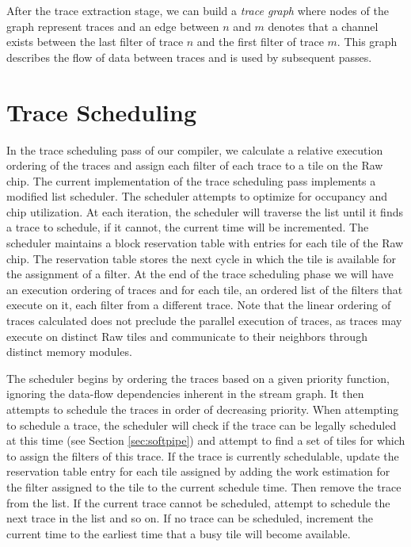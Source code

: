 After the trace extraction stage, we can build a {\it trace graph}
where nodes of the graph represent traces and an edge between $n$ and
$m$ denotes that a channel exists between the last filter of trace $n$
and the first filter of trace $m$. This graph describes the flow of data
between traces and is used by subsequent passes.

\section{Trace Scheduling}
\label{sec:scheduling}
In the trace scheduling pass of our compiler, we calculate a relative
execution ordering of the traces and assign each filter of each trace
to a tile on the Raw chip.  The current implementation of the trace
scheduling pass implements a modified list scheduler. The scheduler
attempts to optimize for occupancy and chip utilization.  At each
iteration, the scheduler will traverse the list until it finds a trace
to schedule, if it cannot, the current time will be incremented.  The
scheduler maintains a block reservation table with entries for each
tile of the Raw chip.  The reservation table stores the next cycle in
which the tile is available for the assignment of a filter.  At the
end of the trace scheduling phase we will have an execution ordering of
traces and for each tile, an ordered list of the filters that execute
on it, each filter from a different trace. Note that the linear
ordering of traces calculated does not preclude the parallel execution
of traces, as traces may execute on distinct Raw tiles and communicate
to their neighbors through distinct memory modules.

The scheduler begins by ordering the traces based on a given priority
function, ignoring the data-flow dependencies inherent in the stream
graph.  It then attempts to schedule the traces in order of decreasing
priority.  When attempting to schedule a trace, the scheduler will
check if the trace can be legally scheduled at this time (see Section
\ref{sec:softpipe}) and attempt to find a set of tiles for which to
assign the filters of this trace. If the trace is currently
schedulable, update the reservation table entry for each tile assigned
by adding the work estimation for the filter assigned to the tile to
the current schedule time. Then remove the trace from the list.
If the current trace cannot be scheduled, attempt to schedule the next
trace in the list and so on.  If no trace can be scheduled, increment the
current time to the earliest time that a busy tile will become
available.

